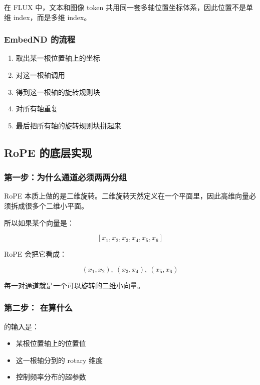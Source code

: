 在 FLUX 中，文本和图像 token 共用同一套多轴位置坐标体系，因此位置不是单维 index，而是多维 index。

\subsubsection{EmbedND 的流程}

\begin{enumerate}[leftmargin=1.5em]
  \item 取出某一根位置轴上的坐标
  \item 对这一根轴调用 
  \item 得到这一根轴的旋转规则块
  \item 对所有轴重复
  \item 最后把所有轴的旋转规则块拼起来
\end{enumerate}

\subsection{RoPE 的底层实现}

\subsubsection{第一步：为什么通道必须两两分组}

RoPE 本质上做的是二维旋转。二维旋转天然定义在一个平面里，因此高维向量必须拆成很多个二维小平面。

所以如果某个向量是：

\[
[x_1, x_2, x_3, x_4, x_5, x_6]
\]

RoPE 会把它看成：

\[
(x_1, x_2),\ (x_3, x_4),\ (x_5, x_6)
\]

每一对通道就是一个可以旋转的二维小向量。

\subsubsection{第二步： 在算什么}

 的输入是：

\begin{itemize}[leftmargin=1.5em]
  \item 某根位置轴上的位置值 
  \item 这一根轴分到的 rotary 维度 
  \item 控制频率分布的超参数 
\end{itemize}

